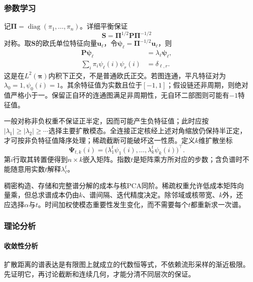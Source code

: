\subsubsection{参数学习}

记$\bm{\Pi}=\operatorname{diag}(\pi_1,\ldots,\pi_n)$。详细平衡保证
\[
  \bm{S}=\bm{\Pi}^{1/2}\bm{P}\bm{\Pi}^{-1/2}
\]
对称。取$\bm{S}$的欧氏单位特征向量$\bm{u}_\ell$，令$\bm{\psi}_\ell=\bm{\Pi}^{-1/2}\bm{u}_\ell$，则
\begin{equation}
  \label{eq:dim-diffusion-eigenvectors}
  \begin{aligned}
    \bm{P}\bm{\psi}_\ell&=\lambda_\ell\bm{\psi}_\ell,\\
    \sum_i\pi_i\psi_\ell(i)\psi_r(i)&=\delta_{\ell,r}.
  \end{aligned}
\end{equation}
这是在$L^2(\bm{\pi})$内积下正交，不是普通欧氏正交。若图连通，平凡特征对为$\lambda_0=1,\psi_0(i)=1$。其余特征值为实数且位于$[-1,1]$；假设链还非周期，则绝对值严格小于一。保留正自环的连通图满足非周期性，无自环二部图则可能有$-1$特征值。

一般对称非负权重不保证正半定，因而可能产生负特征值；此时应按$|\lambda_1|\geq|\lambda_2|\geq\cdots$选择主要扩散模态。全连接正定核经上述对角缩放仍保持半正定，才可按非负特征值降序处理；稀疏截断可能破坏这一性质。定义$k$维扩散坐标
\begin{equation}
  \label{eq:dim-diffusion-map}
  \bm{\Psi}_{t,k}(i)
  =\bigl(\lambda_1^t\psi_1(i),\ldots,
         \lambda_k^t\psi_k(i)\bigr)^{\top}.
\end{equation}
第$i$行取其转置便得到$n\times k$嵌入矩阵。指数$t$是矩阵乘方所对应的步数；含负谱时不能随意用实数$t$解释$\lambda_\ell^t$。

稠密构造、存储和完整谱分解的成本与核PCA同阶。稀疏权重允许低成本矩阵向量乘，但总求谱成本仍由$k$、谱间隔、迭代精度决定。除邻域或核带宽、$k$外，还应选择$\alpha$与$t$。时间加权使模态重要性发生变化，而不需要每个$t$都重新求一次谱。

\subsubsection{理论分析}
\label{sec:dim-diffusion-theory}

\paragraph{收敛性分析}

扩散距离的谱表达是有限图上就成立的代数恒等式，不依赖流形采样的渐近极限。先证明它，再讨论截断和连续几何，才能分清不同层次的保证。

